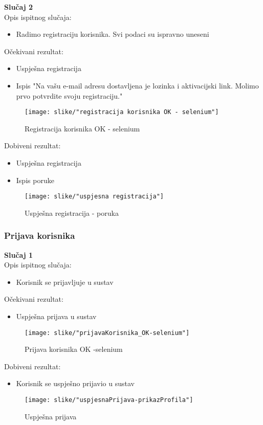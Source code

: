  					\textbf{Slučaj 2}\\
 					Opis ispitnog slučaja:
 					\begin{itemize}
 						\item Radimo registraciju korisnika. Svi podaci su ispravno uneseni
 					\end{itemize}
 					Očekivani rezultat:
 					\begin{itemize}
 						\setlength\itemsep{0.1em}
 						\item Uspješna registracija
 						\item Ispis "Na vašu e-mail adresu dostavljena je lozinka i aktivacijski link. Molimo prvo potvrdite svoju registraciju."
 					\end{itemize}
 					\begin{figure}[H]
 						\texttt{[image: slike/"registracija korisnika OK - selenium"]}
 						\centering
 						\caption{Registracija korisnika OK - selenium}
 						\label{registracija korisnika OK - selenium}
 					\end{figure}
 					Dobiveni rezultat:
 					\begin{itemize}
 						\setlength\itemsep{0.1em}
 						\item Uspješna registracija
 						\item Ispis poruke
 					\end{itemize}
 					\begin{figure}[H]
 						\texttt{[image: slike/"uspjesna registracija"]}
 						\centering
 						\caption{Uspješna registracija - poruka}
 						\label{uspjesna registracija}
 					\end{figure}
		 		\eject
		 		
		 		\subsubsection{Prijava korisnika}
		 			\textbf{Slučaj 1}\\
		 			Opis ispitnog slučaja:
		 			\begin{itemize}
		 				\item Korisnik se prijavljuje u sustav
		 			\end{itemize}
	 				Očekivani rezultat:
	 				\begin{itemize}
	 					\item Uspješna prijava u sustav
	 				\end{itemize}
 					\begin{figure}[H]
 						\texttt{[image: slike/"prijavaKorisnika\_OK-selenium"]}
 						\centering
 						\caption{Prijava korisnika OK -selenium}
 						\label{uspjesna prijava - selenium}
 					\end{figure}
 					Dobiveni rezultat:
 					\begin{itemize}
 						\item Korisnik se uspješno prijavio u sustav
 					\end{itemize}
 					\begin{figure}[H]
 						\texttt{[image: slike/"uspjesnaPrijava-prikazProfila"]}
 						\centering
 						\caption{Uspješna prijava}
 						\label{uspjesna prijava}
 					\end{figure}
 				
